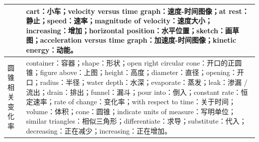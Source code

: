 \documentclass[12pt,a4paper]{article}
\begin{document}
\begin{longtable}{|>{\raggedright\arraybackslash}p{2.2cm}|>{\raggedright\arraybackslash}p{12.8cm}|}
18 &
cart：小车；velocity versus time graph：速度-时间图像；at rest：静止；speed：速率；magnitude of velocity：速度大小；increasing：增加；horizontal position：水平位置；sketch：画草图；acceleration versus time graph：加速度-时间图像；kinetic energy：动能。 \\
\hline

圆锥相关变化率 &
container：容器；shape：形状；open right circular cone：开口的正圆锥；figure above：上图；height：高度；diameter：直径；opening：开口；radius：半径；water depth：水深；evaporate：蒸发；leak：渗漏 / 流出；drain：排出；funnel：漏斗；pour into：倒入；constant rate：恒定速率；rate of change：变化率；with respect to time：关于时间；volume：体积；cone：圆锥；indicate units of measure：写明单位；similar triangles：相似三角形；differentiate：求导；substitute：代入；decreasing：正在减少；increasing：正在增加。 \\
\hline

\end{longtable}
\end{document}
